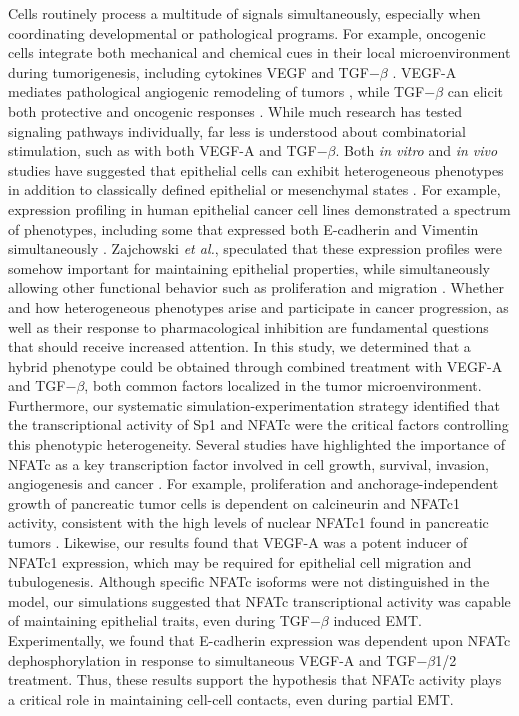 \documentclass[11pt,letterpaper]{article}
\begin{document}
Cells routinely process a multitude of signals simultaneously, especially when coordinating developmental or pathological programs.
For example, oncogenic cells integrate both mechanical and chemical cues in their local microenvironment during tumorigenesis, including cytokines VEGF and TGF$-\beta$ \cite{Hong:2013mi}.
VEGF-A mediates pathological angiogenic remodeling of tumors \cite{Nagy:2007lh}, while TGF$-\beta$ can elicit both protective and oncogenic responses \cite{Ferrara:2002kx,Willis:2007uq}.
While much research has tested signaling pathways individually, far less is understood about combinatorial stimulation, such as with both VEGF-A and TGF$-\beta$.
Both \emph{in vitro} and \emph{in vivo} studies have suggested that epithelial cells can exhibit heterogeneous phenotypes in addition to classically defined epithelial or mesenchymal states \cite{Polyak2009,Strauss:2011fk}.
For example, expression profiling in human epithelial cancer cell lines demonstrated a spectrum of phenotypes, including some that expressed both E-cadherin and Vimentin simultaneously \cite{Neve:2006uq,Welch-Reardon:2014aa}.
Zajchowski \emph{et al.}, speculated that these expression profiles were somehow important for maintaining epithelial properties, while simultaneously allowing other functional behavior such as proliferation and migration \cite{Zajchowski:2001kx}.
Whether and how heterogeneous phenotypes arise and participate in cancer progression, as well as their response to pharmacological inhibition are fundamental questions
that should receive increased attention.
In this study, we determined that a hybrid phenotype could be obtained through combined treatment with VEGF-A and TGF$-\beta$, both common factors localized in the tumor microenvironment.
Furthermore, our systematic simulation-experimentation strategy identified that the transcriptional activity of Sp1 and NFATc were the critical factors controlling this phenotypic heterogeneity.
Several studies have highlighted the importance of NFATc as a key transcription factor involved in cell growth, survival, invasion, angiogenesis and cancer \cite{Mancini2009}.
For example, proliferation and anchorage-independent growth of pancreatic tumor cells is dependent on calcineurin and NFATc1 activity, consistent with the high levels of nuclear NFATc1 found in pancreatic tumors \cite{Singh:2010jx}.
Likewise, our results found that VEGF-A was a potent inducer of NFATc1 expression, which may be required for epithelial cell migration and tubulogenesis.
Although specific NFATc isoforms were not distinguished in the model, our simulations suggested that NFATc transcriptional activity was capable of maintaining epithelial traits, even during TGF$-\beta$ induced EMT.
Experimentally, we found that E-cadherin expression was dependent upon NFATc dephosphorylation in response to simultaneous VEGF-A and TGF$-\beta$1/2 treatment.
Thus, these results support the hypothesis that NFATc activity plays a critical role in maintaining cell-cell contacts, even during partial EMT.
\end{document}

